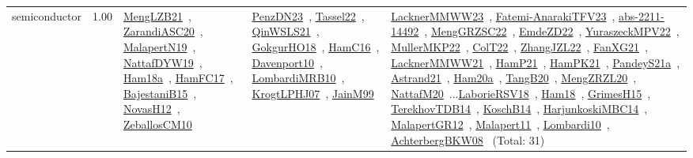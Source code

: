 {\begin{longtable}{p{3cm}r>{\raggedright\arraybackslash}p{6cm}>{\raggedright\arraybackslash}p{6cm}>{\raggedright\arraybackslash}p{8cm}}
\index{semiconductor}\index{ApplicationAreas!semiconductor}semiconductor &  1.00 & \href{../works/MengLZB21.pdf}{MengLZB21}~\cite{MengLZB21}, \href{../works/ZarandiASC20.pdf}{ZarandiASC20}~\cite{ZarandiASC20}, \href{../works/MalapertN19.pdf}{MalapertN19}~\cite{MalapertN19}, \href{../works/NattafDYW19.pdf}{NattafDYW19}~\cite{NattafDYW19}, \href{../works/Ham18a.pdf}{Ham18a}~\cite{Ham18a}, \href{../works/HamFC17.pdf}{HamFC17}~\cite{HamFC17}, \href{../works/BajestaniB15.pdf}{BajestaniB15}~\cite{BajestaniB15}, \href{../works/NovasH12.pdf}{NovasH12}~\cite{NovasH12}, \href{../works/ZeballosCM10.pdf}{ZeballosCM10}~\cite{ZeballosCM10} & \href{../works/PenzDN23.pdf}{PenzDN23}~\cite{PenzDN23}, \href{../works/Tassel22.pdf}{Tassel22}~\cite{Tassel22}, \href{../works/QinWSLS21.pdf}{QinWSLS21}~\cite{QinWSLS21}, \href{../works/GokgurHO18.pdf}{GokgurHO18}~\cite{GokgurHO18}, \href{../works/HamC16.pdf}{HamC16}~\cite{HamC16}, \href{../works/Davenport10.pdf}{Davenport10}~\cite{Davenport10}, \href{../works/LombardiMRB10.pdf}{LombardiMRB10}~\cite{LombardiMRB10}, \href{../works/KrogtLPHJ07.pdf}{KrogtLPHJ07}~\cite{KrogtLPHJ07}, \href{../works/JainM99.pdf}{JainM99}~\cite{JainM99} & \href{../works/LacknerMMWW23.pdf}{LacknerMMWW23}~\cite{LacknerMMWW23}, \href{../works/Fatemi-AnarakiTFV23.pdf}{Fatemi-AnarakiTFV23}~\cite{Fatemi-AnarakiTFV23}, \href{../works/abs-2211-14492.pdf}{abs-2211-14492}~\cite{abs-2211-14492}, \href{../works/MengGRZSC22.pdf}{MengGRZSC22}~\cite{MengGRZSC22}, \href{../works/EmdeZD22.pdf}{EmdeZD22}~\cite{EmdeZD22}, \href{../works/YuraszeckMPV22.pdf}{YuraszeckMPV22}~\cite{YuraszeckMPV22}, \href{../works/MullerMKP22.pdf}{MullerMKP22}~\cite{MullerMKP22}, \href{../works/ColT22.pdf}{ColT22}~\cite{ColT22}, \href{../works/ZhangJZL22.pdf}{ZhangJZL22}~\cite{ZhangJZL22}, \href{../works/FanXG21.pdf}{FanXG21}~\cite{FanXG21}, \href{../works/LacknerMMWW21.pdf}{LacknerMMWW21}~\cite{LacknerMMWW21}, \href{../works/HamP21.pdf}{HamP21}~\cite{HamP21}, \href{../works/HamPK21.pdf}{HamPK21}~\cite{HamPK21}, \href{../works/PandeyS21a.pdf}{PandeyS21a}~\cite{PandeyS21a}, \href{../works/Astrand21.pdf}{Astrand21}~\cite{Astrand21}, \href{../works/Ham20a.pdf}{Ham20a}~\cite{Ham20a}, \href{../works/TangB20.pdf}{TangB20}~\cite{TangB20}, \href{../works/MengZRZL20.pdf}{MengZRZL20}~\cite{MengZRZL20}, \href{../works/NattafM20.pdf}{NattafM20}~\cite{NattafM20}...\href{../works/LaborieRSV18.pdf}{LaborieRSV18}~\cite{LaborieRSV18}, \href{../works/Ham18.pdf}{Ham18}~\cite{Ham18}, \href{../works/GrimesH15.pdf}{GrimesH15}~\cite{GrimesH15}, \href{../works/TerekhovTDB14.pdf}{TerekhovTDB14}~\cite{TerekhovTDB14}, \href{../works/KoschB14.pdf}{KoschB14}~\cite{KoschB14}, \href{../works/HarjunkoskiMBC14.pdf}{HarjunkoskiMBC14}~\cite{HarjunkoskiMBC14}, \href{../works/MalapertGR12.pdf}{MalapertGR12}~\cite{MalapertGR12}, \href{../works/Malapert11.pdf}{Malapert11}~\cite{Malapert11}, \href{../works/Lombardi10.pdf}{Lombardi10}~\cite{Lombardi10}, \href{../works/AchterbergBKW08.pdf}{AchterbergBKW08}~\cite{AchterbergBKW08} (Total: 31)\\

\end{longtable}}

